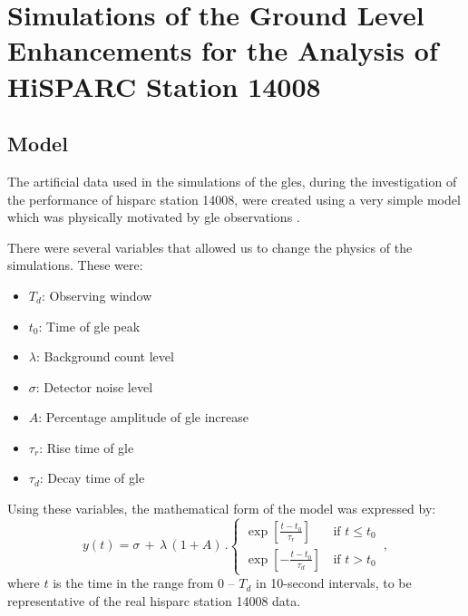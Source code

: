 \chapter{Simulations of the Ground Level Enhancements for the Analysis of HiSPARC Station 14008}\label{app:GLE_sims}


\section{Model}

The artificial data used in the simulations of the \glspl{gle}, during the investigation of the performance of \gls{hisparc} station 14008, were created using a very simple model which was physically motivated by \gls{gle} observations \citep{strauss_pulse_2017}.

There were several variables that allowed us to change the physics of the simulations. These were:

\begin{itemize}
	\item{{\bf $T_d$}: Observing window}
	\item{{\bf $t_0$}: Time of \gls{gle} peak}
	\item{{\bf $\lambda$}}: Background count level
	\item{{\bf $\sigma$}}: Detector noise level
	\item{{\bf $A$}: Percentage amplitude of \gls{gle} increase}
	\item{{\bf $\tau_r$}: Rise time of \gls{gle}}
	\item{{\bf $\tau_d$}: Decay time of \gls{gle}}
\end{itemize}

Using these variables, the mathematical form of the model was expressed by:
%
\begin{equation}
    y(t) =  \sigma \, + \, \lambda \, (1 + A) \, . 
\begin{cases}

\exp\left[{\frac{t - t_0}{\tau_r}}\right] \,  & \text{if           $t \leq t_0$} \\

\exp\left[{-\frac{t - t_0}{\tau_d}}\right] \,  & \text{if           $t > t_0$} 

\end{cases} \, ,
\label{eq:GLE_model}
\end{equation}
%
where $t$ is the time in the range from 0 -- $T_d$ in 10-second intervals, to be representative of the real \gls{hisparc} station 14008 data.

